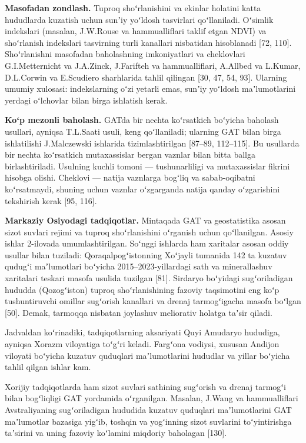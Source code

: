\textbf{Masofadan zondlash.} Tuproq shoʻrlanishini va ekinlar holatini
katta hududlarda kuzatish uchun sunʼiy yoʻldosh tasvirlari qoʻllaniladi.
Oʻsimlik indekslari (masalan, J.W.Rouse va hammualliflari taklif etgan
NDVI) va shoʻrlanish indekslari tasvirning turli kanallari nisbatidan
hisoblanadi {[}72, 110{]}. Shoʻrlanishni masofadan baholashning
imkoniyatlari va cheklovlari G.I.Metternicht va J.A.Zinck, J.Farifteh va
hammualliflari, A.Allbed va L.Kumar, D.L.Corwin va E.Scudiero
sharhlarida tahlil qilingan {[}30, 47, 54, 93{]}. Ularning umumiy
xulosasi: indekslarning oʻzi yetarli emas, sunʼiy yoʻldosh
maʼlumotlarini yerdagi oʻlchovlar bilan birga ishlatish kerak.

\textbf{Koʻp mezonli baholash.} GATda bir nechta koʻrsatkich boʻyicha
baholash usullari, ayniqsa T.L.Saati usuli, keng qoʻllaniladi; ularning
GAT bilan birga ishlatilishi J.Malczewski ishlarida tizimlashtirilgan
{[}87--89, 112--115{]}. Bu usullarda bir nechta koʻrsatkich
mutaxassislar bergan vaznlar bilan bitta ballga birlashtiriladi.
Usulning kuchli tomoni --- tushunarliligi va mutaxassislar fikrini
hisobga olishi. Cheklovi --- natija vaznlarga bogʻliq va sabab-oqibatni
koʻrsatmaydi, shuning uchun vaznlar oʻzgarganda natija qanday
oʻzgarishini tekshirish kerak {[}95, 116{]}.

\textbf{Markaziy Osiyodagi tadqiqotlar.} Mintaqada GAT va geostatistika
asosan sizot suvlari rejimi va tuproq shoʻrlanishini oʻrganish uchun
qoʻllanilgan. Asosiy ishlar 2-ilovada umumlashtirilgan. Soʻnggi ishlarda
ham xaritalar asosan oddiy usullar bilan tuziladi: Qoraqalpogʻistonning
Xoʻjayli tumanida 142 ta kuzatuv qudugʻi maʼlumotlari boʻyicha
2015--2023-yillardagi sath va minerallashuv xaritalari teskari masofa
usulida tuzilgan {[}81{]}. Sirdaryo boʻyidagi sugʻoriladigan hududda
(Qozogʻiston) tuproq shoʻrlanishining fazoviy taqsimotini eng koʻp
tushuntiruvchi omillar sugʻorish kanallari va drenaj tarmogʻigacha
masofa boʻlgan {[}50{]}. Demak, tarmoqqa nisbatan joylashuv meliorativ
holatga taʼsir qiladi.

Jadvaldan koʻrinadiki, tadqiqotlarning aksariyati Quyi Amudaryo
hududiga, ayniqsa Xorazm viloyatiga toʻgʻri keladi. Fargʻona vodiysi,
xususan Andijon viloyati boʻyicha kuzatuv quduqlari maʼlumotlarini
hududlar va yillar boʻyicha tahlil qilgan ishlar kam.

Xorijiy tadqiqotlarda ham sizot suvlari sathining sugʻorish va drenaj
tarmogʻi bilan bogʻliqligi GAT yordamida oʻrganilgan. Masalan, J.Wang va
hammualliflari Avstraliyaning sugʻoriladigan hududida kuzatuv quduqlari
maʼlumotlarini GAT maʼlumotlar bazasiga yigʻib, toshqin va yogʻinning
sizot suvlarini toʻyintirishga taʼsirini va uning fazoviy koʻlamini
miqdoriy baholagan {[}130{]}.


